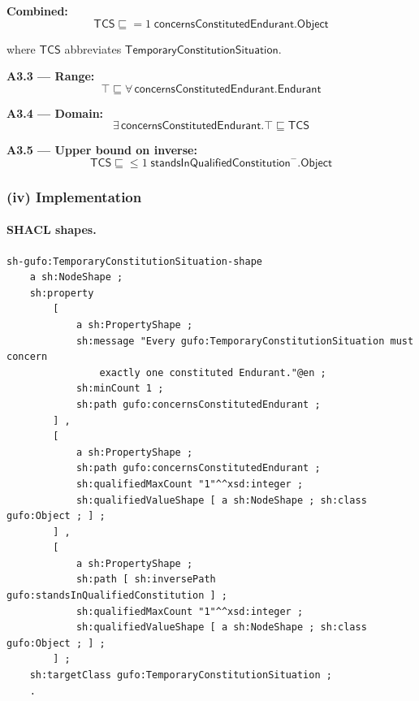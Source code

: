 \documentclass[12pt,a4paper]{article}
\begin{document}
\textbf{Combined:}
\begin{equation*}
  \mathsf{TCS} \sqsubseteq {=}1\;\mathsf{concernsConstitutedEndurant}.\mathsf{Object}
\end{equation*}

where $\mathsf{TCS}$ abbreviates $\mathsf{TemporaryConstitutionSituation}$.

\textbf{A3.3 --- Range:}
\begin{equation*}
  \top \sqsubseteq \forall\,\mathsf{concernsConstitutedEndurant}.\mathsf{Endurant}
\end{equation*}

\textbf{A3.4 --- Domain:}
\begin{equation*}
  \exists\,\mathsf{concernsConstitutedEndurant}.\top \sqsubseteq \mathsf{TCS}
\end{equation*}

\textbf{A3.5 --- Upper bound on inverse:}
\begin{equation*}
  \mathsf{TCS} \sqsubseteq {\leq}1\;\mathsf{standsInQualifiedConstitution}^{-}.\mathsf{Object}
\end{equation*}

\subsubsection*{(iv) Implementation}

\paragraph{SHACL shapes.}

\begin{lstlisting}[style=turtlestyle]
sh-gufo:TemporaryConstitutionSituation-shape
    a sh:NodeShape ;
    sh:property
        [
            a sh:PropertyShape ;
            sh:message "Every gufo:TemporaryConstitutionSituation must concern
                exactly one constituted Endurant."@en ;
            sh:minCount 1 ;
            sh:path gufo:concernsConstitutedEndurant ;
        ] ,
        [
            a sh:PropertyShape ;
            sh:path gufo:concernsConstitutedEndurant ;
            sh:qualifiedMaxCount "1"^^xsd:integer ;
            sh:qualifiedValueShape [ a sh:NodeShape ; sh:class gufo:Object ; ] ;
        ] ,
        [
            a sh:PropertyShape ;
            sh:path [ sh:inversePath gufo:standsInQualifiedConstitution ] ;
            sh:qualifiedMaxCount "1"^^xsd:integer ;
            sh:qualifiedValueShape [ a sh:NodeShape ; sh:class gufo:Object ; ] ;
        ] ;
    sh:targetClass gufo:TemporaryConstitutionSituation ;
    .
\end{lstlisting}
\end{document}
